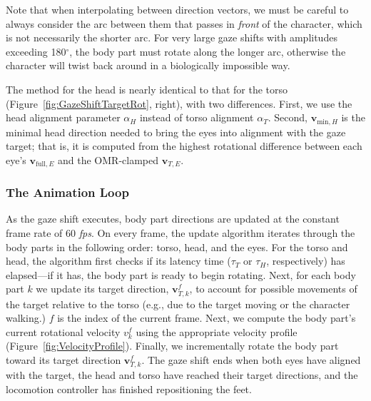 Note that when interpolating between direction vectors, we must be careful to always consider the arc between them that passes in \emph{front} of the character, which is not necessarily the shorter arc. For very large gaze shifts with amplitudes exceeding 180$^\circ$, the body part must rotate along the longer arc, otherwise the character will twist back around in a biologically impossible way.

The method for the head is nearly identical to that for the torso (Figure~\ref{fig:GazeShiftTargetRot}, right), with two differences. First, we use the head alignment parameter $\alpha_H$ instead of torso alignment $\alpha_T$. Second, $\mathbf{v}_{\mathrm{min},H}$ is the minimal head direction needed to bring the eyes into alignment with the gaze target; that is, it is computed from the highest rotational difference between each eye's $\mathbf{v}_{\mathrm{full},E}$ and the OMR-clamped $\mathbf{v}_{T,E}$.

\subsubsection{The Animation Loop}

As the gaze shift executes, body part directions are updated at the constant frame rate of 60 \emph{fps}. On every frame, the update algorithm iterates through the body parts in the following order: torso, head, and the eyes. For the torso and head, the algorithm first checks if its latency time ($\tau_T$ or $\tau_H$, respectively) has elapsed---if it has, the body part is ready to begin rotating. Next, for each body part $k$ we update its target direction, $\mathbf{v}^f_{T,k}$, to account for possible movements of the target relative to the torso (e.g., due to the target moving or the character walking.) $f$ is the index of the current frame. Next, we compute the body part's current rotational velocity $v^f_k$ using the appropriate velocity profile (Figure~\ref{fig:VelocityProfile}). Finally, we incrementally rotate the body part toward its target direction $\mathbf{v}^f_{T,k}$. The gaze shift ends when both eyes have aligned with the target, the head and torso have reached their target directions, and the locomotion controller has finished repositioning the feet.

